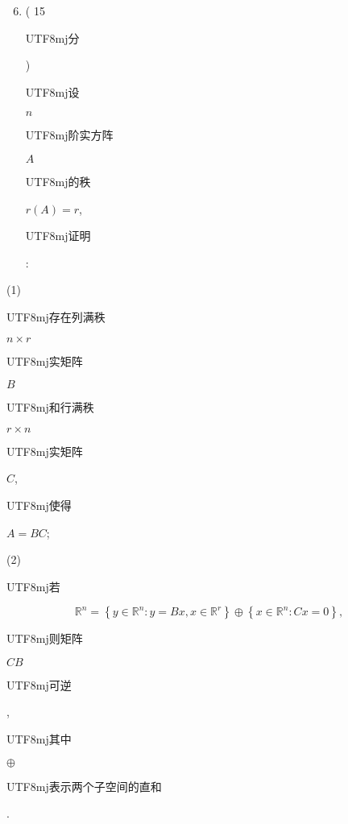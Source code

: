 \documentclass[10pt]{article}
\begin{document}
\begin{enumerate}
  \setcounter{enumi}{5}
  \item ( 15 \begin{CJK}{UTF8}{mj}分\end{CJK}) \begin{CJK}{UTF8}{mj}设\end{CJK} $n$ \begin{CJK}{UTF8}{mj}阶实方阵\end{CJK} $A$ \begin{CJK}{UTF8}{mj}的秩\end{CJK} $r(A)=r$, \begin{CJK}{UTF8}{mj}证明\end{CJK}:
\end{enumerate}
(1) \begin{CJK}{UTF8}{mj}存在列满秩\end{CJK} $n \times r$ \begin{CJK}{UTF8}{mj}实矩阵\end{CJK} $B$ \begin{CJK}{UTF8}{mj}和行满秩\end{CJK} $r \times n$ \begin{CJK}{UTF8}{mj}实矩阵\end{CJK} $C$, \begin{CJK}{UTF8}{mj}使得\end{CJK} $A=B C$;

(2) \begin{CJK}{UTF8}{mj}若\end{CJK}
$$
\mathbb{R}^{n}=\left\{y \in \mathbb{R}^{n}: y=B x, x \in \mathbb{R}^{r}\right\} \oplus\left\{x \in \mathbb{R}^{n}: C x=0\right\},
$$
\begin{CJK}{UTF8}{mj}则矩阵\end{CJK} $C B$ \begin{CJK}{UTF8}{mj}可逆\end{CJK}, \begin{CJK}{UTF8}{mj}其中\end{CJK} $\oplus$ \begin{CJK}{UTF8}{mj}表示两个子空间的直和\end{CJK}.
\end{document}
